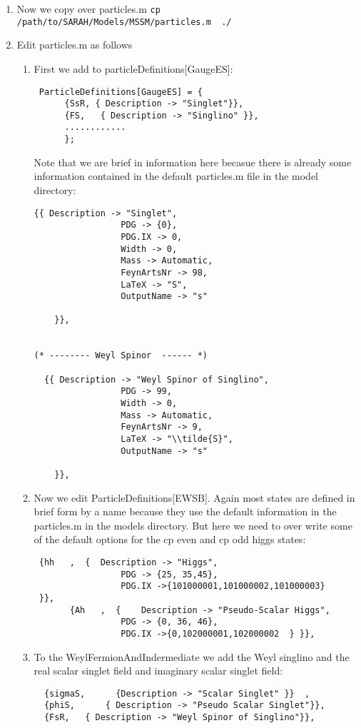 \documentclass[final,3p,11pt,pdflatex]{elsarticle}
\newcommand{\code}[1]{\lstinline|#1|}  %
\begin{document}
\begin{enumerate}
\begin{enumerate}
\begin{lstlisting}
\end{lstlisting}
\end{enumerate}
\item Now we copy over particles.m \code{cp /path/to/SARAH/Models/MSSM/particles.m  ./}
\item Edit particles.m as follows
\begin{enumerate}  
\item First we add to particleDefinitions[GaugeES]:
\begin{lstlisting}
 ParticleDefinitions[GaugeES] = {
      {SsR, { Description -> "Singlet"}},        
      {FS,   { Description -> "Singlino" }},    
      ............
      };
\end{lstlisting}
Note that we are brief in information here becasue there is already some information contained in the default particles.m file in the model directory:
\begin{lstlisting} 
{{ Description -> "Singlet", 
                 PDG -> {0},
                 PDG.IX -> 0,
                 Width -> 0, 
                 Mass -> Automatic,
                 FeynArtsNr -> 98,
                 LaTeX -> "S",
                 OutputName -> "s"

    }},    
   
   
(* -------- Weyl Spinor  ------ *)   
    
  {{ Description -> "Weyl Spinor of Singlino", 
                 PDG -> 99,
                 Width -> 0, 
                 Mass -> Automatic,
                 FeynArtsNr -> 9,
                 LaTeX -> "\\tilde{S}",
                 OutputName -> "s"

    }},  

\end{lstlisting}
 \item Now we edit ParticleDefinitions[EWSB].  Again most states are defined in brief form by a name because they use the default information in the particles.m in the models directory.  But here we need to over write some of the default options for the cp even and cp odd higgs states: 
\begin{lstlisting}
 {hh   ,  {  Description -> "Higgs", 
                 PDG -> {25, 35,45},
                 PDG.IX ->{101000001,101000002,101000003}
 }}, 
       {Ah   ,  {    Description -> "Pseudo-Scalar Higgs",
                 PDG -> {0, 36, 46},
                 PDG.IX ->{0,102000001,102000002  } }}, 

\end{lstlisting}
\item To the WeylFermionAndIndermediate we add the Weyl singlino and the real scalar singlet field and imaginary scalar singlet field:  
 \begin{lstlisting}
  {sigmaS,      {Description -> "Scalar Singlet" }}  ,
  {phiS,      { Description -> "Pseudo Scalar Singlet"}},
  {FsR,   { Description -> "Weyl Spinor of Singlino"}},
 \end{lstlisting}
 

\end{enumerate}
\end{enumerate}
\end{document}

